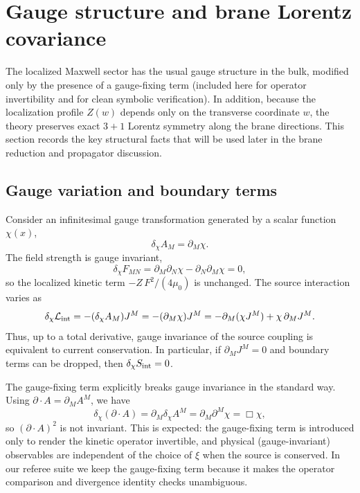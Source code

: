 \documentclass[11pt]{article}
\newcommand{\A}{A}
\newcommand{\F}{F}
\newcommand{\J}{J}
\newcommand{\Z}{Z}
\newcommand{\muo}{\mu_0}
\newcommand{\xigf}{\xi}
\begin{document}
\section{Gauge structure and brane Lorentz covariance}
\label{sec:gauge_lorentz}

The localized Maxwell sector has the usual gauge structure in the bulk, modified
only by the presence of a gauge-fixing term (included here for operator
invertibility and for clean symbolic verification). In addition, because the
localization profile \(\Z(w)\) depends only on the transverse coordinate \(w\),
the theory preserves exact \(3+1\) Lorentz symmetry along the brane directions.
This section records the key structural facts that will be used later in the
brane reduction and propagator discussion.

\subsection{Gauge variation and boundary terms}
\label{sec:gauge_variation}

Consider an infinitesimal gauge transformation generated by a scalar function
\(\chi(x)\),
\begin{equation}
  \delta_\chi \A_M = \partial_M \chi.
  \label{eq:gauge_var_A}
\end{equation}
The field strength is gauge invariant,
\begin{equation}
  \delta_\chi \F_{MN}
  = \partial_M\partial_N\chi - \partial_N\partial_M\chi
  = 0,
\end{equation}
so the localized kinetic term \(-\Z\,\F^2/(4\muo)\) is unchanged. The source
interaction varies as
\begin{equation}
  \delta_\chi \mathcal{L}_{\rm int}
  = -(\delta_\chi \A_M)\J^M
  = -(\partial_M\chi)\J^M
  = -\partial_M(\chi\J^M) + \chi\,\partial_M\J^M.
  \label{eq:gauge_var_int}
\end{equation}
Thus, up to a total derivative, gauge invariance of the source coupling is
equivalent to current conservation. In particular, if \(\partial_M\J^M=0\) and
boundary terms can be dropped, then \(\delta_\chi S_{\rm int}=0\).

The gauge-fixing term explicitly breaks gauge invariance in the standard way.
Using \(\partial\!\cdot\!\A=\partial_M\A^M\), we have
\begin{equation}
  \delta_\chi(\partial\!\cdot\!\A)
  = \partial_M\delta_\chi \A^M
  = \partial_M\partial^M\chi
  = \Box \chi,
  \label{eq:divA_shift}
\end{equation}
so \((\partial\!\cdot\!\A)^2\) is not invariant. This is expected: the
gauge-fixing term is introduced only to render the kinetic operator invertible,
and physical (gauge-invariant) observables are independent of the choice of
\(\xigf\) when the source is conserved. In our referee suite we keep the
gauge-fixing term because it makes the operator comparison and divergence
identity checks unambiguous.
\end{document}
